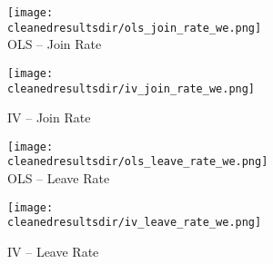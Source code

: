\documentclass{article}
\newcommand{\cleanedresultsdir}{../results/cleaned}
\begin{document}
\clearpage

\begin{figure}[H]
  \centering
  \texttt{[image: \\cleanedresultsdir/ols\_join\_rate\_we.png]}\\[2pt]
  \caption*{OLS – Join Rate}
  \texttt{[image: \\cleanedresultsdir/iv\_join\_rate\_we.png]}\\[2pt]
  \caption*{IV – Join Rate}
\end{figure}

\clearpage

\begin{figure}[H]
  \centering
  \texttt{[image: \\cleanedresultsdir/ols\_leave\_rate\_we.png]}\\[2pt]
  \caption*{OLS – Leave Rate}
  \texttt{[image: \\cleanedresultsdir/iv\_leave\_rate\_we.png]}\\[2pt]
  \caption*{IV – Leave Rate}
\end{figure}
\end{document}
